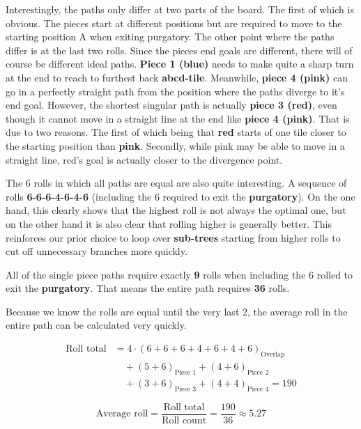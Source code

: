 \documentclass[12pt]{article}
\begin{document}
\newpage
Interestingly, the paths only differ at two parts of the board. The first of which is obvious. The pieces start at different positions but are required to move to the starting position A when exiting purgatory. The other point where the paths differ is at the last two rolls. Since the pieces end goals are different, there will of course be different ideal paths. \textbf{Piece 1 (blue)} needs to make quite a sharp turn at the end to reach to furthest back \textbf{abcd-tile}. Meanwhile, \textbf{piece 4 (pink)} can go in a perfectly straight path from the position where the paths diverge to it's end goal. However, the shortest singular path is actually \textbf{piece 3 (red)}, even though it cannot move in a straight line at the end like \textbf{piece 4 (pink)}. That is due to two reasons. The first of which being that \textbf{red} starts of one tile closer to the starting position than \textbf{pink}. Secondly, while pink may be able to move in a straight line, red's goal is actually closer to the divergence point.

The 6 rolls in which all paths are equal are also quite interesting. A sequence of rolls \textbf{6-6-6-4-6-4-6} (including the 6 required to exit the \textbf{purgatory}). On the one hand, this clearly shows that the highest roll is not always the optimal one, but on the other hand it is also clear that rolling higher is generally better. This reinforces our prior choice to loop over \textbf{sub-trees} starting from higher rolls to cut off unnecessary branches more quickly.

All of the single piece paths require exactly \textbf{9} rolls when including the 6 rolled to exit the \textbf{purgatory}. That means the entire path requires \textbf{36} rolls.

Because we know the rolls are equal until the very last 2, the average roll in the entire path can be calculated very quickly.

\begin{align*}
    \text{Roll total} &= 4 \cdot \left( 6+6+6+4+6+4+6 \right)_{\text{Overlap}} \\
    &\quad + \left( 5+6 \right)_{\text{Piece 1}} + \left( 4+6 \right)_{\text{Piece 2}} \\
    &\quad + \left( 3+6 \right)_{\text{Piece 3}} + \left( 4+4 \right)_{\text{Piece 4}} = 190
\end{align*}

\[
	\text{Average roll} =  \frac{\text{Roll total}}{\text{Roll count}} = \frac{190}{36} \approx 5.27
\]
\end{document}
